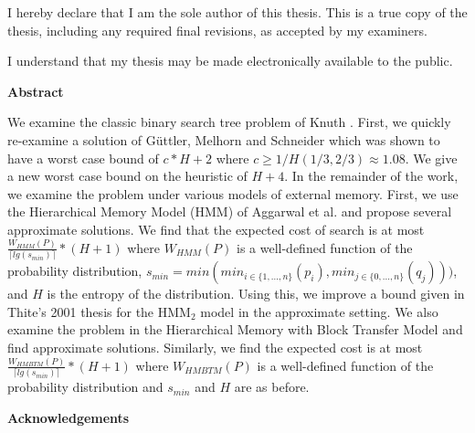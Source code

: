   \noindent
I hereby declare that I am the sole author of this thesis. This is a true copy of the thesis, including any required final revisions, as accepted by my examiners.

  \bigskip
  
  \noindent
I understand that my thesis may be made electronically available to the public.

\cleardoublepage


\begin{center}\textbf{Abstract}\end{center}

We examine the classic binary search tree problem of Knuth \cite{knuth1971optimum}. First, we quickly re-examine a solution of G{\"u}ttler, Melhorn and Schneider \cite{guttler1980binary} which was shown to have a worst case bound of $c*H + 2$ where $c \geq 1/H(1/3,2/3) \approx 1.08$. We give a new worst case bound on the heuristic of $H+4$. In the remainder of the work, we examine the problem under various models of external memory. First, we use the Hierarchical Memory Model (HMM) of Aggarwal et al. \cite{aggarwal1987model} and propose several approximate solutions. We find that the expected cost of search is at most $\frac{W_{HMM}(P)}{\lceil lg(s_{min}) \rceil} * (H+1)$ where $W_{HMM}(P)$ is a well-defined function of the probability distribution, $s_{min} = min(min_{i \in \{1,...,n\}}(p_i), min_{j \in \{0,...,n\}}(q_j)))$, and $H$ is the entropy of the distribution. Using this, we improve a bound given in Thite's 2001 thesis for the HMM$_2$ model in the approximate setting. We also examine the problem in the Hierarchical Memory with Block Transfer Model \cite{aggarwal1987hierarchical} and find approximate solutions. Similarly, we find the expected cost is at most $\frac{W_{HMBTM}(P)}{\lceil lg(s_{min}) \rceil} * (H+1)$ where $W_{HMBTM}(P)$ is a well-defined function of the probability distribution and $s_{min}$ and $H$ are as before. 

\cleardoublepage


\begin{center}\textbf{Acknowledgements}\end{center}

